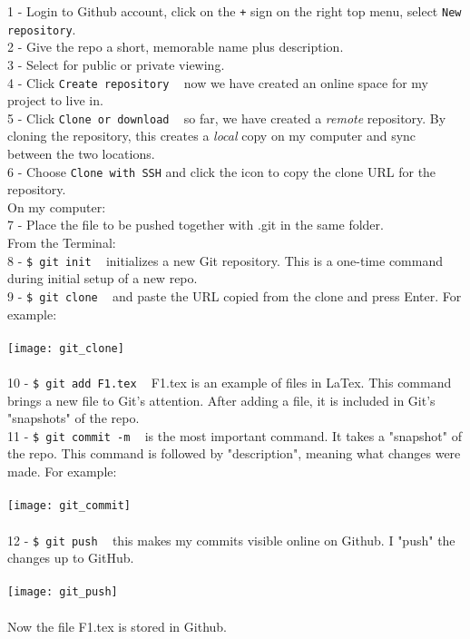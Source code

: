 \documentclass{article}
\begin{document}
{{1 - Login to Github account, click on the \texttt{+} sign on the right top menu, select \texttt{New repository}.\\
2 - Give the repo a short, memorable name plus description. \\
3 - Select for public or private viewing.\\ 
4 - Click \texttt{Create repository} ~ now we have created an online space for my project to live in. \\
5 - Click \texttt{Clone or download} ~ so far, we have created a \textit{remote} repository. By cloning the repository, this creates a \textit{local} copy on my computer and sync between the two locations.\\
6 - Choose \texttt{Clone with SSH} and click the icon to copy the clone URL for the repository.\\
On my computer:\\
7 - Place the file to be pushed together with .git in the same folder.\\
From the Terminal:\\
8 - \texttt{\$ git init} ~ initializes a new Git repository. This is a one-time command during initial setup of a new repo.\\
9 - \texttt{\$ git clone} ~ and paste the URL copied from the clone and press Enter. For example: \\
\\
\texttt{[image: git\_clone]}\\
\\
10 - \texttt{\$ git add F1.tex} ~ F1.tex is an example of files in LaTex. This command brings a new file to Git's attention. After adding a file, it is included in Git's "snapshots" of the repo.\\
11 - \texttt{\$ git commit -m} ~ is the most important command. It takes a "snapshot" of the repo. This command is followed by "description", meaning what changes were made. For example: \\
\\
\texttt{[image: git\_commit]}\\
\\
12 - \texttt{\$ git push} ~ this makes my commits visible online on Github. I "push" the changes up to GitHub. \\
\\
\texttt{[image: git\_push]}\\
\\
Now the file F1.tex is stored in Github.

}}
\end{document}
